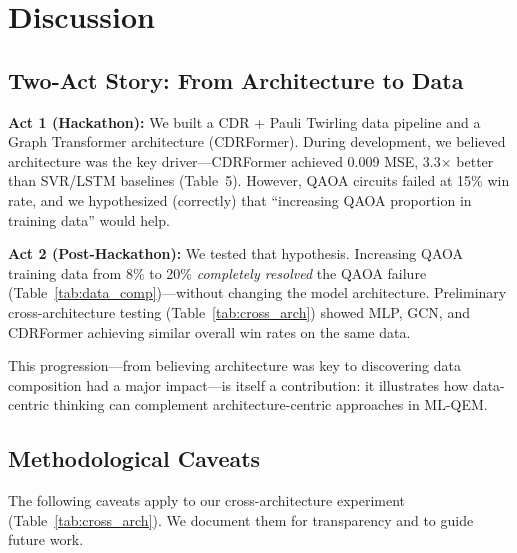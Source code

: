 \documentclass[11pt, a4paper]{article}
\begin{document}
\section{Discussion}
\label{sec:discussion}

\subsection{Two-Act Story: From Architecture to Data}

\textbf{Act 1 (Hackathon):} We built a CDR + Pauli Twirling data pipeline
and a Graph Transformer architecture (CDRFormer). During development, we
believed architecture was the key driver---CDRFormer achieved 0.009 MSE,
3.3$\times$ better than SVR/LSTM baselines (Table~5). However, QAOA circuits
failed at 15\% win rate, and we hypothesized (correctly) that
``increasing QAOA proportion in training data'' would help.

\textbf{Act 2 (Post-Hackathon):} We tested that hypothesis. Increasing
QAOA training data from 8\% to 20\% \emph{completely resolved} the QAOA failure
(Table~\ref{tab:data_comp})---without changing the model architecture.
Preliminary cross-architecture testing (Table~\ref{tab:cross_arch}) showed
MLP, GCN, and CDRFormer achieving similar overall win rates on the same data.

This progression---from believing architecture was key to discovering data
composition had a major impact---is itself a contribution: it illustrates
how data-centric thinking can complement architecture-centric approaches
in ML-QEM.

\subsection{Methodological Caveats}

\begin{limitation}
The following caveats apply to our cross-architecture experiment
(Table~\ref{tab:cross_arch}). We document them for transparency and to
guide future work.
\end{limitation}
\end{document}

